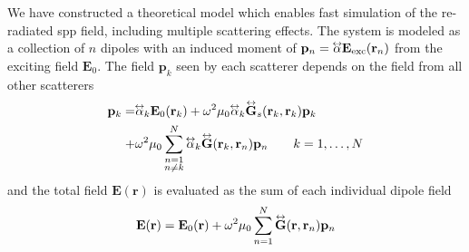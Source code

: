 We have constructed a theoretical model which enables fast simulation of
the re-radiated \gls{spp} field, including multiple scattering effects. The
system is modeled as a collection of $n$ dipoles with an induced moment of
$\mathbf{p}_n=\tensor{\alpha} \mathbf{E}_\mathrm{exc}(\mathbf{r}_n)$
from the exciting field $\mathbf{E}_0$. The field $\mathbf{p}_k$ seen by
each scatterer depends on the field from all other scatterers
\begin{align}
  \mathbf{p}_k = & \tensor{\alpha}_k \mathbf{E}_0(\mathbf{r}_k)
  +\omega^2 \mu_0 \tensor{\alpha}_k \tensor{\mathbf{G}}_s(\mathbf{r}_k,\mathbf{r}_k)\mathbf{p}_k \\
  +              & \omega^2\mu_0 \sum_{\substack{n=1                                             \\n \ne k}}^N
  \tensor{\alpha}_k
  \tensor{\mathbf{G}}(\mathbf{r}_k,\mathbf{r}_n)\mathbf{p}_n\qquad k=1,\ldots,N
\end{align}
and the total field $\mathbf{E}(\mathbf{r})$ is evaluated as the sum of each individual dipole field
\begin{equation}
  \mathbf{E}(\mathbf{r}) = \mathbf{E}_0(\mathbf{r}) + \omega^2 \mu_0
  \sum_{n=1}^{N} \tensor{\mathbf{G}}(\mathbf{r},\mathbf{r}_n) \mathbf{p}_n
\end{equation}

